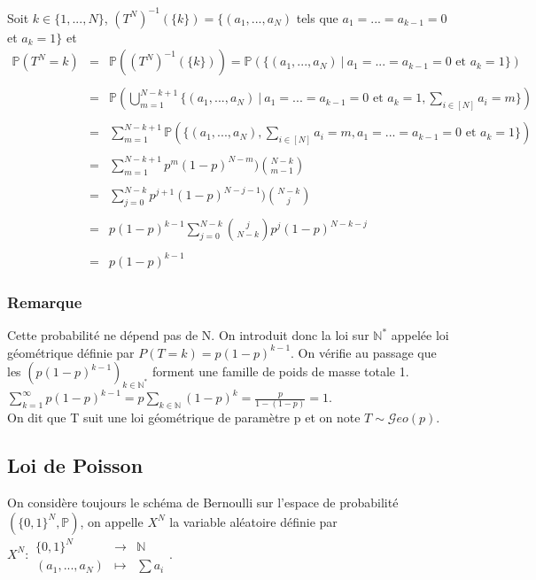 \documentclass[a4paper,10pt]{book} %
\newcommand{\N}{\mathbb{N}}
\renewcommand{\P}{\mathbb{P}} %
\newcommand{\tq}{~|~}
\begin{document}
Soit $k\in \{1,...,N\}$, 
$(T^N)^{-1}(\{k\})=\{(a_1,...,a_N)$ tels que $a_1=...=a_{k-1}=0$ et $a_k=1\}$ et 
$$\begin{array}{rcl}\P(T^N=k)
&=&\displaystyle \P((T^N)^{-1}(\{k\}))=\P(\{(a_1,...,a_N) \tq a_1=...=a_{k-1}=0\text{ et }a_k=1\})\\\\
&=&\displaystyle \P(\bigcup_{m=1}^{N-k+1}\{(a_1,...,a_N)\tq a_1=...=a_{k-1}=0\text{ et }a_k=1, \sum_{i\in[N]} a_i=m\})\\\\
&=&\displaystyle  \sum_{m=1}^{N-k+1}\P(\{(a_1,...,a_N), \sum_{i\in[N]}a_i=m, a_1=...=a_{k-1}=0\text{ et }a_k=1\})\\\\
&=& \displaystyle\sum_{m=1}^{N-k+1}p^m(1-p)^{N-m})\binom{N-k}{m-1}\\\\
&=& \displaystyle \sum_{j=0}^{N-k}p^{j+1}(1-p)^{N-j-1})\binom{N-k}{j}\\\\
&=&\displaystyle p(1-p)^{k-1}\sum_{j=0}^{N-k}\binom{j}{N-k}p^j(1-p)^{N-k-j}\\\\
&=&\displaystyle p(1-p)^{k-1}
\end{array}$$

\subsubsection{Remarque}
Cette probabilité ne dépend pas de N. On introduit donc la loi sur $\N^*$ appelée loi géométrique définie par $P(T=k)=p(1-p)^{k-1}$. On vérifie au passage que les $(p(1-p)^{k-1})_{k\in \N^*}$ forment une famille de poids de masse totale 1.\\

$\displaystyle\sum_{k=1}^{\infty} p(1-p)^{k-1}=p\sum_{k\in \N}(1-p)^k=\frac{p}{1-(1-p)}=1$.\\

On dit que T suit une loi géométrique de paramètre p et on note $T\sim \mathcal{G}eo(p)$.

\newpage

\subsection{Loi de Poisson}
On considère toujours le schéma de Bernoulli sur l'espace de probabilité $(\{0,1\}^N,\P)$, on appelle $X^N$ la variable aléatoire définie par $X^N :\begin{array}{rcl}\{0,1\}^N&\rightarrow& \N \\ (a_1,...,a_N)&\mapsto& \sum a_i\end{array}$.\\
\end{document}
